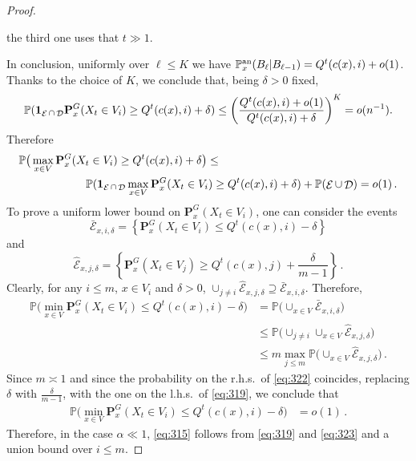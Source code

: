 \documentclass[11pt,oneside]{amsart}
\numberwithin{equation}{section}  %
\theoremstyle{plain}
\newcommand{\rhs}{{r.h.s.~}}
\newcommand{\lhs}{{l.h.s.~}}
\DeclareMathOperator{\cD}{\mathcal{D}}
\DeclareMathOperator{\cE}{\mathcal{E}}
\newcommand{\p}{\mathbb{P}}
\newcommand{\one}{\textup{\textbf{1}}}
\newcommand{\quenchG}{\mathbf{P}^G}
\newcommand{\pan}{\p^{\textup{an}}}
\newcommand{\semi}{{Q}}
\begin{document}
\begin{proof}
\begin{enumerate}
                the third one uses that $t\gg 1$. 
			\end{enumerate}
			In conclusion,  uniformly over ${\ell}\le K$ we have $\pan_x(B_{\ell}|B_{{\ell}-1})=\semi^t(c(x),i)+o(1)$.
			Thanks to the choice of $K$, we conclude that, being $\delta>0$ fixed,
			\begin{equation}
	\p(\one_{\cE\cap\cD}\quenchG_x(X_t\in V_i)\ge\semi^t(c(x),i)+ \delta)
			\le \left(\frac{\semi^t(c(x),i)+o(1)}{\semi^t(c(x),i)+\delta}\right)^K 
			=o(n^{-1}).
			\end{equation}
			Therefore
   			\begin{equation}\label{eq:319}
            \begin{split}
				&\p\big(\max_{x \in V}\quenchG_x(X_t\in V_i)\ge \semi^t(c(x),i)+\delta\big)
				\le \\
                &\qquad\qquad \qquad\p(\one_{\cE\cap\cD}\max_{x \in V}\quenchG_x(X_t\in V_i)\ge \semi^t(c(x),i)+ \delta)+\p(\cE\cup\cD)=o(1)\,.
                \end{split}
			\end{equation}
            			To prove a uniform lower bound on $\quenchG_x(X_t\in V_i)$, one can consider the events
            \begin{equation}
        \bar{\mathcal{E}}_{x,i,\delta}=\left\{ \quenchG_x(X_t\in V_i)\le\semi^t(c(x),i)- \delta\right\}
            \end{equation}
            and
\begin{equation}
\hat{\mathcal{E}}_{x,j,\delta}=\left\{\quenchG_x(X_t\in V_j)\ge\semi^t(c(x),j)+   \frac{\delta}{m-1}\right\}\,.
            \end{equation}
Clearly, for any $i\le m$, $x\in V_i$ and $\delta>0$,  $\cup_{j\neq i}\hat{\mathcal{E}}_{x,j,\delta}\supseteq\bar{\mathcal{E}}_{x,i,\delta} $.
Therefore,
\begin{equation}\label{eq:322}
    \begin{split}
        \p\big(\min_{x \in V}\quenchG_x(X_t\in V_i)\le \semi^t(c(x),i)-\delta\big)&= \p\big(\cup_{x\in V}\bar{\mathcal{E}}_{x,i,\delta}\big)\\
        &\le\p\big(\cup_{j\neq i}\cup_{x\in V}\hat{\mathcal{E}}_{x,j,\delta}\big)\\
        &\le m\max_{j\le m}\p\big(\cup_{x\in V}\hat{\mathcal{E}}_{x,j,\delta}\big)\,.
    \end{split}
\end{equation}
Since $m\asymp 1$ and since the probability on the \rhs of \eqref{eq:322} coincides, replacing $\delta$ with $\frac{\delta}{m-1}$, with the one on the \lhs of \eqref{eq:319}, we conclude that
\begin{equation}\label{eq:323}
    \begin{split}
        \p\big(\min_{x \in V}\quenchG_x(X_t\in V_i)\le \semi^t(c(x),i)-\delta\big)&= o(1)\,.
    \end{split}
\end{equation}
Therefore, in the case $\alpha\ll1$, \eqref{eq:315} follows from \eqref{eq:319} and \eqref{eq:323} and a union bound over $i\le m$.


\end{proof}
\end{document}
